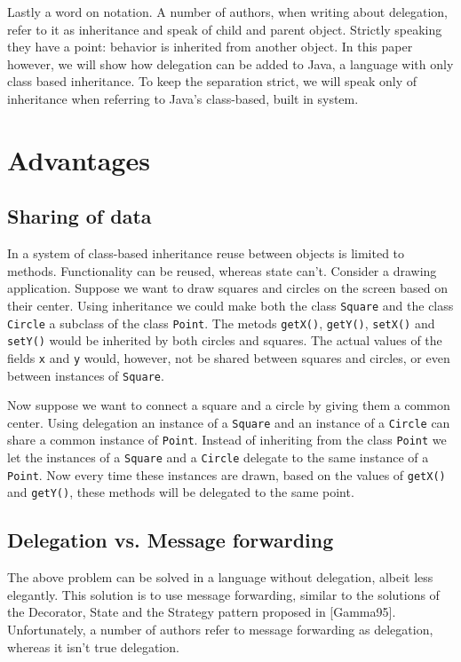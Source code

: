 \documentclass[a4paper,12pt]{book}
\begin{document}
Lastly a word on notation. A number of authors, when writing about delegation, refer to it as inheritance and speak of child and parent object. Strictly speaking they have a point: behavior is inherited from another object. In this paper however, we will show how delegation can be added to Java, a language with only class based inheritance. To keep the separation strict, we will speak only of inheritance when referring to Java's class-based, built in system.

\section*{Advantages}
\subsection*{Sharing of data}
In a system of class-based inheritance reuse between objects is limited to methods. Functionality can be reused, whereas state can't. Consider a drawing application. Suppose we want to draw squares and circles on the screen based on their center. Using inheritance we could make both the class \verb|Square| and the class \verb|Circle| a subclass of the class \verb|Point|. The metods \verb|getX()|, \verb|getY()|, \verb|setX()| and \verb|setY()| would be inherited by both circles and squares. The actual values of the fields \verb|x| and \verb|y| would, however, not be shared between squares and circles, or even between instances of \verb|Square|.

Now suppose we want to connect a square and a circle by giving them a common center. Using delegation an instance of a \verb|Square| and an instance of a \verb|Circle| can share a common instance of \verb|Point|. Instead of inheriting from the class \verb|Point| we let the instances of a \verb|Square| and a \verb|Circle| delegate to the same instance of a \verb|Point|. Now every time these instances are drawn, based on the values of \verb|getX()| and \verb|getY()|, these methods will be delegated to the same point.

\subsection*{Delegation vs. Message forwarding}
The above problem can be solved in a language without delegation, albeit less elegantly. This solution is to use message forwarding, similar to the solutions of the Decorator, State and the Strategy pattern proposed in [Gamma95]. Unfortunately, a number of authors refer to message forwarding as delegation, whereas it isn't true delegation. 
\end{document}
